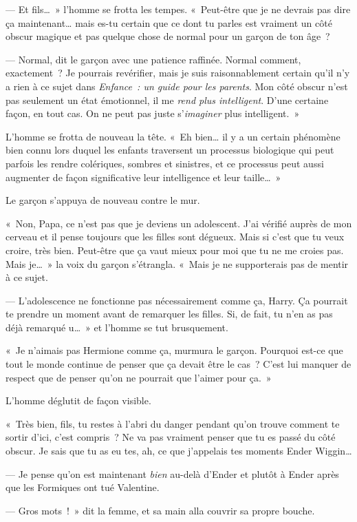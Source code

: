 --- Et fils…~» l'homme se frotta les tempes. «~Peut-être que je ne devrais pas dire ça maintenant… mais es-tu certain que ce dont tu parles est vraiment un côté obscur magique et pas quelque chose de normal pour un garçon de ton âge~?

--- Normal, dit le garçon avec une patience raffinée. Normal comment, exactement~? Je pourrais revérifier, mais je suis raisonnablement certain qu'il n'y a rien à ce sujet dans \emph{Enfance~: un guide pour les parents}. Mon côté obscur n'est pas seulement un état émotionnel, il me \emph{rend plus intelligent}. D'une certaine façon, en tout cas. On ne peut pas juste s'\emph{imaginer} plus intelligent.~»

L'homme se frotta de nouveau la tête. «~Eh bien… il y a un certain phénomène bien connu lors duquel les enfants traversent un processus biologique qui peut parfois les rendre colériques, sombres et sinistres, et ce processus peut aussi augmenter de façon significative leur intelligence et leur taille…~»

Le garçon s'appuya de nouveau contre le mur.

«~Non, Papa, ce n'est pas que je deviens un adolescent. J'ai vérifié auprès de mon cerveau et il pense toujours que les filles sont dégueux. Mais si c'est que tu veux croire, très bien. Peut-être que ça vaut mieux pour moi que tu ne me croies pas. Mais je…~» la voix du garçon s'étrangla. «~Mais je ne supporterais pas de mentir à ce sujet.

--- L'adolescence ne fonctionne pas nécessairement comme ça, Harry. Ça pourrait te prendre un moment avant de remarquer les filles. Si, de fait, tu n'en as pas déjà remarqué u…~» et l'homme se tut brusquement.

«~Je n'aimais pas Hermione comme ça, murmura le garçon. Pourquoi est-ce que tout le monde continue de penser que ça devait être le cas~? C'est lui manquer de respect que de penser qu'on ne pourrait que l'aimer pour ça.~»

L'homme déglutit de façon visible.

«~Très bien, fils, tu restes à l'abri du danger pendant qu'on trouve comment te sortir d'ici, c'est compris~? Ne va pas vraiment penser que tu es passé du côté obscur. Je sais que tu as eu tes, ah, ce que j'appelais tes moments Ender Wiggin…

--- Je pense qu'on est maintenant \emph{bien} au-delà d'Ender et plutôt à Ender après que les Formiques ont tué Valentine.

--- Gros mots~!~» dit la femme, et sa main alla couvrir sa propre bouche.

